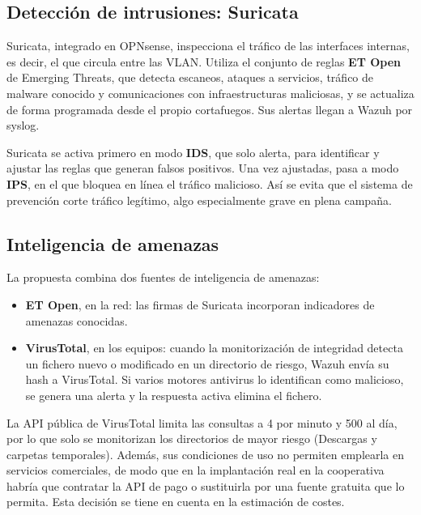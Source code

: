 \documentclass[11pt,a4paper,oneside]{report}
\begin{document}
\subsection{Detección de intrusiones: Suricata}

Suricata, integrado en OPNsense, inspecciona el tráfico de las interfaces internas, es decir, el que circula entre las VLAN. Utiliza el conjunto de reglas \textbf{ET Open} de Emerging Threats, que detecta escaneos, ataques a servicios, tráfico de malware conocido y comunicaciones con infraestructuras maliciosas, y se actualiza de forma programada desde el propio cortafuegos. Sus alertas llegan a Wazuh por syslog.

Suricata se activa primero en modo \textbf{IDS}, que solo alerta, para identificar y ajustar las reglas que generan falsos positivos. Una vez ajustadas, pasa a modo \textbf{IPS}, en el que bloquea en línea el tráfico malicioso. Así se evita que el sistema de prevención corte tráfico legítimo, algo especialmente grave en plena campaña.

\subsection{Inteligencia de amenazas}

La propuesta combina dos fuentes de inteligencia de amenazas:
\begin{itemize}
  \item \textbf{ET Open}, en la red: las firmas de Suricata incorporan indicadores de amenazas conocidas.
  \item \textbf{VirusTotal}, en los equipos: cuando la monitorización de integridad detecta un fichero nuevo o modificado en un directorio de riesgo, Wazuh envía su hash a VirusTotal. Si varios motores antivirus lo identifican como malicioso, se genera una alerta y la respuesta activa elimina el fichero.
\end{itemize}

La API pública de VirusTotal limita las consultas a 4 por minuto y 500 al día, por lo que solo se monitorizan los directorios de mayor riesgo (Descargas y carpetas temporales). Además, sus condiciones de uso no permiten emplearla en servicios comerciales, de modo que en la implantación real en la cooperativa habría que contratar la API de pago o sustituirla por una fuente gratuita que lo permita. Esta decisión se tiene en cuenta en la estimación de costes.

\end{document}
